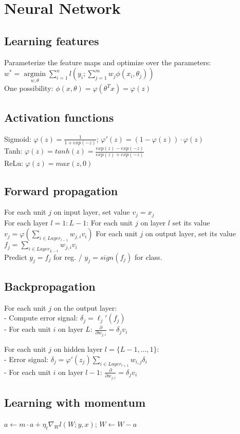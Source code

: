 \section*{Neural Network}
\subsection*{Learning features}

Parameterize the feature maps and optimize over the parameters:\\
$w^* = \underset{w, \theta}{\operatorname{argmin}} \sum_{i=1}^n l(y_i; \sum_{j=1}^m w_j \phi(x_i, \theta_j))$\\
One possibility: $\phi(x,\theta) = \varphi(\theta^T x) = \varphi(z)$

\subsection*{Activation functions}
Sigmoid: $\varphi(z) = \frac{1}{1+exp(-z)}$;  $\varphi'(z) = (1 - \varphi(z))\cdot\varphi(z)$\\
Tanh: $\varphi(z) = tanh(z) = \frac{exp(z)-exp(-z)}{exp(z)+exp(-z)}$\\
ReLu:  $\varphi(z) = max(z,0)$

\subsection*{Forward propagation}
For each unit $j$ on input layer, set value $v_j=x_j$\\
For each layer $l=1:L-1$: For each unit $j$ on layer $l$ set its value $v_j = \varphi(\sum_{i\in Layer_{l-1}} w_{j,i}v_i)$
For each unit $j$ on output layer, set its value $f_j = \sum_{i\in Layer_{L-1}} w_{j,i}v_i$\\
Predict $y_j = f_j$ for reg. / $y_j = sign(f_j)$ for class.

\subsection*{Backpropagation}
For each unit $j$ on the output layer:\\
- Compute error signal: $\delta_j = \ell_j'(f_j)$\\
- For each unit $i$ on layer $L$: $\frac{\partial}{\partial w_{j,i}} = \delta_j v_i$

For each unit $j$ on hidden layer $l=\{L-1,...,1\}$:\\
- Error signal: $\delta_j = \varphi'(z_j) \sum_{i\in Layer_{l+1}} w_{i,j}\delta_i$\\
- For each unit $i$ on layer $l-1$: $\frac{\partial}{\partial w_{j,i}} = \delta_j v_i$

\subsection*{Learning with momentum}
$a \leftarrow m \cdot a + \eta_t \nabla_W l(W;y,x)$; $W \leftarrow W - a$
